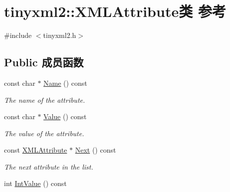 \hypertarget{classtinyxml2_1_1_x_m_l_attribute}{}\section{tinyxml2\+:\+:X\+M\+L\+Attribute类 参考}
\label{classtinyxml2_1_1_x_m_l_attribute}


{\ttfamily \#include $<$tinyxml2.\+h$>$}

\subsection*{Public 成员函数}
\begin{DoxyCompactItemize}
\item 
\mbox{\label{classtinyxml2_1_1_x_m_l_attribute_a5a5c135d24cce7abda6f17301c6274d8}} 
const char $\ast$ \hyperlink{classtinyxml2_1_1_x_m_l_attribute_a5a5c135d24cce7abda6f17301c6274d8}{Name} () const
\begin{DoxyCompactList}\small\item\em The name of the attribute. \end{DoxyCompactList}\item 
\mbox{\label{classtinyxml2_1_1_x_m_l_attribute_ab1c5cd993f836a771818ca408994b14e}} 
const char $\ast$ \hyperlink{classtinyxml2_1_1_x_m_l_attribute_ab1c5cd993f836a771818ca408994b14e}{Value} () const
\begin{DoxyCompactList}\small\item\em The value of the attribute. \end{DoxyCompactList}\item 
\mbox{\label{classtinyxml2_1_1_x_m_l_attribute_aee53571b21e7ce5421eb929523a8bbe6}} 
const \hyperlink{classtinyxml2_1_1_x_m_l_attribute}{X\+M\+L\+Attribute} $\ast$ \hyperlink{classtinyxml2_1_1_x_m_l_attribute_aee53571b21e7ce5421eb929523a8bbe6}{Next} () const
\begin{DoxyCompactList}\small\item\em The next attribute in the list. \end{DoxyCompactList}\item 
int \hyperlink{classtinyxml2_1_1_x_m_l_attribute_adfa2433f0fdafd5c3880936de9affa80}{Int\+Value} () const
\item 

\end{DoxyCompactItemize}
